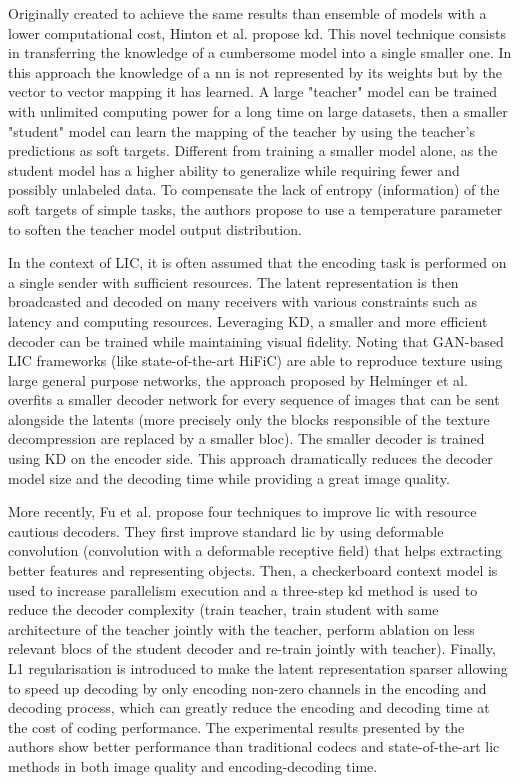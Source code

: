 \documentclass{article}
\begin{document}
Originally created to achieve the same results than ensemble of models with a lower computational cost, Hinton et al. \cite{hinton2015distillingknowledgeneuralnetwork} propose \acrlong{kd}. This novel technique consists in transferring the knowledge of a cumbersome model into a single smaller one. In this approach the knowledge of a \acrshort{nn} is not represented by its weights but by the vector to vector mapping it has learned. A large "teacher" model can be trained with unlimited computing power for a long time on large datasets, then a smaller "student" model can learn the mapping of the teacher by using the teacher's predictions as soft targets. Different from training a smaller model alone, as the student model has a higher ability to generalize while requiring fewer and possibly unlabeled data. To compensate the lack of entropy (information) of the soft targets of simple tasks, the authors propose to use a temperature parameter to soften the teacher model output distribution.

In the context of LIC, it is often assumed that the encoding task is performed on a single sender with sufficient resources. The latent representation is then broadcasted and decoded on many receivers with various constraints such as latency and computing resources. Leveraging KD, a smaller and more efficient decoder can be trained while maintaining visual fidelity. Noting that GAN-based LIC frameworks (like state-of-the-art HiFiC) are able to reproduce texture using large general purpose networks, the approach proposed by Helminger et al. \cite{helminger2022microdosingknowledgedistillationgan} overfits a smaller decoder network for every sequence of images that can be sent alongside the latents (more precisely only the blocks responsible of the texture decompression are replaced by a smaller bloc). The smaller decoder is trained using KD on the encoder side. This approach dramatically reduces the decoder model size and the decoding time while providing a great image quality.

More recently, Fu et al. \cite{fu2023fasthighperformancelearnedimage} propose four techniques to improve \acrshort{lic} with resource cautious decoders. They first improve standard \acrshort{lic} by using deformable convolution (convolution with a deformable receptive field) that helps extracting better features and representing objects. Then, a checkerboard context model is used to increase parallelism execution and a three-step \acrshort{kd} method is used to reduce the decoder complexity (train teacher, train student with same architecture of the teacher jointly with the teacher, perform ablation on less relevant blocs of the student decoder and re-train jointly with teacher). Finally, L1 regularisation is introduced to make the latent representation sparser allowing to speed up decoding by only encoding non-zero channels in the encoding and decoding process, which can greatly reduce the encoding and decoding time at the cost of coding performance. The experimental results presented by the authors show better performance than traditional codecs and state-of-the-art \acrshort{lic} methods in both image quality and encoding-decoding time.
\end{document}
